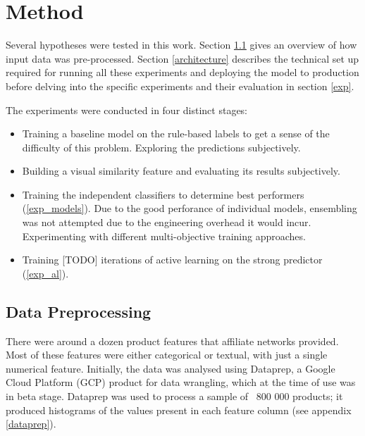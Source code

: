 \chapter{Method}


Several hypotheses were tested in this work.
Section \ref{data_pp} gives an overview of how input data was pre-processed.
Section \ref{architecture} describes the technical set up required for running all these experiments and deploying the model to production before delving into the specific experiments and their evaluation in section \ref{exp}.

\hfill \break \noindent
The experiments were conducted in four distinct stages:

 \begin{itemize}
   \item
    Training a baseline model on the rule-based labels to get a sense of the difficulty of this problem.
    Exploring the predictions subjectively.
   \item Building a visual similarity feature and evaluating its results subjectively.
   \item
    Training the independent classifiers to determine best performers (\ref{exp_models}).
    Due to the good perforance of individual models, ensembling was not attempted due to the engineering overhead it would incur.
    Experimenting with different multi-objective training approaches.
   \item Training [TODO] iterations of active learning on the strong predictor (\ref{exp_al}).
 \end{itemize}


 \section{Data Preprocessing}
 \label{data_pp}

There were around a dozen product features that affiliate networks provided.
Most of these features were either categorical or textual,  with just a single numerical feature.
Initially, the data was analysed using Dataprep, a Google Cloud Platform (GCP)  product for data wrangling, which at the time of use was in beta stage.
Dataprep  was used to process a sample of ~800 000 products;  it produced histograms of the values present in each feature column (see appendix \ref{dataprep}).

